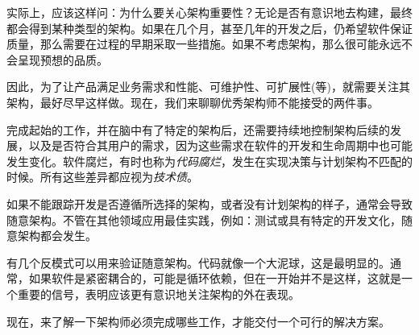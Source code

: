
实际上，应该这样问：为什么要关心架构重要性？无论是否有意识地去构建，最终都会得到某种类型的架构。如果在几个月，甚至几年的开发之后，仍希望软件保证质量，那么需要在过程的早期采取一些措施。如果不考虑架构，那么很可能永远不会呈现预想的品质。

因此，为了让产品满足业务需求和性能、可维护性、可扩展性(等)，就需要关注其架构，最好尽早这样做。现在，我们来聊聊优秀架构师不能接受的两件事。


完成起始的工作，并在脑中有了特定的架构后，还需要持续地控制架构后续的发展，以及是否符合其用户的需求，因为这些需求在软件的开发和生命周期中也可能发生变化。软件腐烂，有时也称为\textit{代码腐烂}，发生在实现决策与计划架构不匹配的时候。所有这些差异都应视为\textit{技术债}。


如果不能跟踪开发是否遵循所选择的架构，或者没有计划架构的样子，通常会导致随意架构。不管在其他领域应用最佳实践，例如：测试或具有特定的开发文化，随意架构都会发生。

有几个反模式可以用来验证随意架构。代码就像一个大泥球，这是最明显的。通常，如果软件是紧密耦合的，可能是循环依赖，但在一开始并不是这样，这就是一个重要的信号，表明应该更有意识地关注架构的外在表现。

现在，来了解一下架构师必须完成哪些工作，才能交付一个可行的解决方案。









